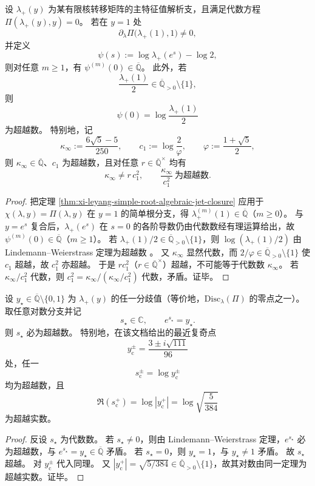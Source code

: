 \begin{corollary}[有限核热力学的导数代数性与熵项超越性]\label{cor:xi-leyang-finite-kernel-algebraic-vs-transcendental-layering}
设 \(\lambda_+(y)\) 为某有限核转移矩阵的主特征值解析支，且满足代数方程 \(\Pi(\lambda_+(y),y)=0\)。
若在 \(y=1\) 处
\[
\partial_{\lambda}\Pi\!\bigl(\lambda_+(1),1\bigr)\neq0,
\]
并定义
\[
\psi(s):=\log\lambda_+(e^s)-\log2,
\]
则对任意 \(m\ge1\)，有 \(\psi^{(m)}(0)\in\overline{\mathbb Q}\)。
此外，若
\[
\frac{\lambda_+(1)}{2}\in\overline{\mathbb Q}_{>0}\setminus\{1\},
\]
则
\[
\psi(0)=\log\!\frac{\lambda_+(1)}{2}
\]
为超越数。
特别地，记
\[
\kappa_{\infty}:=\frac{6\sqrt5-5}{250},
\qquad
c_1:=\log\!\frac{2}{\varphi},
\qquad
\varphi:=\frac{1+\sqrt5}{2},
\]
则 \(\kappa_{\infty}\in\overline{\mathbb Q}\)、\(c_1\) 为超越数，且对任意 \(r\in\overline{\mathbb Q}^{\times}\) 均有
\[
\kappa_{\infty}\neq r\,c_1^{2},
\qquad
\frac{\kappa_{\infty}}{c_1^{2}}\ \text{为超越数}.
\]
\end{corollary}
\begin{proof}
把定理 \ref{thm:xi-leyang-simple-root-algebraic-jet-closure} 应用于 \(\chi(\lambda,y)=\Pi(\lambda,y)\) 在 \(y=1\) 的简单根分支，得 \(\lambda_+^{(m)}(1)\in\overline{\mathbb Q}\)（\(m\ge0\)）。
与 \(y=e^s\) 复合后，\(\lambda_+(e^s)\) 在 \(s=0\) 的各阶导数仍由代数数经有理运算给出，故 \(\psi^{(m)}(0)\in\overline{\mathbb Q}\)（\(m\ge1\)）。
若 \(\lambda_+(1)/2\in\overline{\mathbb Q}_{>0}\setminus\{1\}\)，则 \(\log(\lambda_+(1)/2)\) 由 Lindemann--Weierstrass 定理为超越数 \cite{Baker1975TranscendentalNumberTheory}。
又 \(\kappa_{\infty}\) 显然代数，而 \(2/\varphi\in\overline{\mathbb Q}_{>0}\setminus\{1\}\) 使 \(c_1\) 超越，故 \(c_1^2\) 亦超越。
于是 \(r c_1^2\)（\(r\in\overline{\mathbb Q}^{\times}\)）超越，不可能等于代数数 \(\kappa_{\infty}\)。
若 \(\kappa_{\infty}/c_1^2\) 代数，则 \(c_1^2=\kappa_{\infty}/(\kappa_{\infty}/c_1^2)\) 代数，矛盾。证毕。
\end{proof}

\begin{theorem}\label{thm:xi-leyang-log-singularity-transcendence}
设 \(y_{\star}\in\overline{\mathbb Q}\setminus\{0,1\}\) 为 \(\lambda_+(y)\) 的任一分歧值（等价地，\(\mathrm{Disc}_{\lambda}(\Pi)\) 的零点之一）。
取任意对数分支并记
\[
s_{\star}\in\mathbb C,\qquad e^{s_{\star}}=y_{\star}.
\]
则 \(s_{\star}\) 必为超越数。
特别地，在该文档给出的最近复奇点
\[
y_{\mathrm c}^{\pm}=\frac{3\pm i\sqrt{111}}{96}
\]
处，任一
\[
s_{\mathrm c}^{\pm}=\log y_{\mathrm c}^{\pm}
\]
均为超越数，且
\[
\Re(s_{\mathrm c}^{+})
=\log|y_{\mathrm c}^{+}|
=\log\sqrt{\frac{5}{384}}
\]
为超越实数。
\end{theorem}
\begin{proof}
反设 \(s_{\star}\) 为代数数。
若 \(s_{\star}\neq0\)，则由 Lindemann--Weierstrass 定理，\(e^{s_{\star}}\) 必为超越数，与 \(e^{s_{\star}}=y_{\star}\in\overline{\mathbb Q}\) 矛盾。
若 \(s_{\star}=0\)，则 \(y_{\star}=1\)，与 \(y_{\star}\neq1\) 矛盾。
故 \(s_{\star}\) 超越。
对 \(y_{\mathrm c}^{\pm}\) 代入同理。
又 \(|y_{\mathrm c}^{+}|=\sqrt{5/384}\in\overline{\mathbb Q}_{>0}\setminus\{1\}\)，故其对数由同一定理为超越实数。证毕。
\end{proof}

